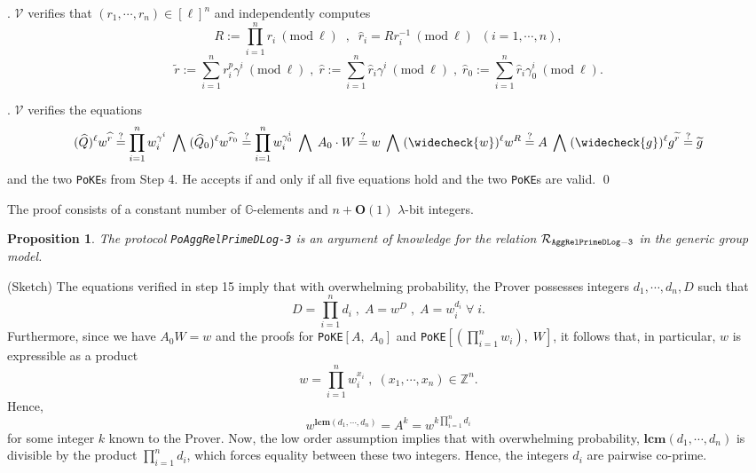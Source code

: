 \documentclass[11pt, lettersize, notitlepage, leqno, footskip=0.6cm]{article}
\newcommand{\bz}{\mathbb Z}
\newcommand{\pl}{\prod\limits}
\newcommand{\slim}{\sum\limits}
\newcommand{\wti}{\widetilde}
\newcommand{\mc}{\mathcal}
\newcommand{\mb}{\mathbb}
\newcommand{\mbf}{\mathbf}
\newcommand{\lam}{\lambda}
\newcommand{\what}{\widehat}
\newcommand{\weck}{\widecheck}
\newcommand{\bO}{\mbf{O}}
\newcommand{\V}{\mc{V}}
\newcommand{\vs}{\vspace{-0.15cm}}
\newcommand{\noin}{\noindent}
\newcommand{\op}{overwhelming probability}
\newcommand{\sta}{\stackrel{?}{=}}
\newcommand{\Mod}[1]{\ (\mathrm{mod}\ #1)}
\newcommand{\LCM}{\mbf{lcm}}
\newtheorem{Prop}[Thm]{Proposition}
\numberwithin{equation}{section}
\begin{document}
\begin{enumerate}[wide, labelwidth=!, labelindent=0pt]
\noin 14. $\V$ verifies that $(r_1,\cdots,r_n)\in [\ell]^{n}$ and independently computes \vs $$R:= \pl_{i=1}^n r_i\Mod{\ell} \;\;,\;\;\what{r}_i = Rr_i^{-1}\Mod{\ell}\;\;(i=1,\cdots,n),$$\vspace{-0.3cm} $$\wti{r}:= \slim_{i=1}^n {r}_i^{p}\gamma^i\Mod{\ell} \;,\; \what{r}:= \slim_{i=1}^n \what{r}_i\gamma^i\Mod{\ell}\;,\;\what{r}_0:= \slim_{i=1}^n \what{r}_i\gamma_0^i\Mod{\ell}.$$

\noin 15. $\V$ verifies the equations \vs $$(\what{Q})^{\ell}w^{\what{r}}\sta \pl_{i=1}^n w_i^{\gamma^i} \;\bigwedge\; (\what{Q}_0)^{\ell}w^{\what{r}_0}\sta \pl_{i=1}^n w_i^{\gamma_0^i}\;\bigwedge\; A_0\cdot W\sta w\;\bigwedge\; (\weck{w})^{\ell}w^R\sta A\;\bigwedge\; (\weck{g})^{\ell}g^{\wti{r}}\sta\wti{g}$$ and the two \verb|PoKE|s from Step 4. He accepts if and only if all five equations hold and the two \verb|PoKE|s are valid. 
\qed \end{enumerate}

\noin The proof consists of a constant number of $\mb{G}$-elements and $n+\bO(1)$ $\lam$-bit integers.

\vspace{0.1cm}


\begin{Prop} The protocol \verb|PoAggRelPrimeDLog-3| is an argument of knowledge for the relation $\mc{R}_{\tt{AggRelPrimeDLog-3}}$ in the generic group model.\end{Prop}

\begin{prf} (Sketch) The equations verified in step 15 imply that with \op, the Prover possesses integers $d_1,\cdots,d_n, D$ such that \vs $$D = \pl_{i=1}^n d_i\;,\;A = w^D\;,\; A= w_i^{d_i}\;\forall \;i .$$ Furthermore, since we have $A_0W = w$ and the proofs for \verb|PoKE|$[A,\;A_0]$ and \verb|PoKE|$[(\pl_{i=1}^n w_i),\; W]$, it follows that, in particular, $w$ is expressible as a product \vs $$w =\pl_{i=1}^n w_i^{x_i}\;,\;(x_1,\cdots,x_n)\in\bz^n.$$ Hence, \vs $$w^{\LCM(d_1,\cdots,d_n)} = A^k = w^{k\pl_{i=1}^n d_i}$$ for some integer $k$ known to the Prover. Now, the low order assumption implies that with \op, $\LCM(d_1,\cdots,d_n)$ is divisible by the product $\pl_{i=1}^n d_i$, which forces equality between these two integers. Hence, the integers $d_i$ are pairwise co-prime.\end{prf}



\bigskip
\end{document}
